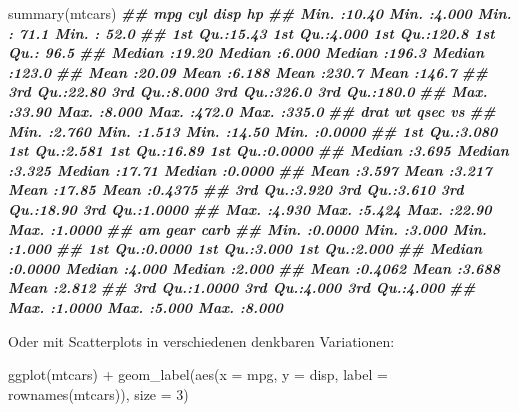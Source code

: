 \documentclass[
  ngerman,
]{article}
\newenvironment{Shaded}{\begin{snugshade}}{\end{snugshade}}
\newcommand{\AttributeTok}[1]{\textcolor[rgb]{0.77,0.63,0.00}{#1}}
\newcommand{\DecValTok}[1]{\textcolor[rgb]{0.00,0.00,0.81}{#1}}
\newcommand{\DocumentationTok}[1]{\textcolor[rgb]{0.56,0.35,0.01}{\textbf{\textit{#1}}}}
\newcommand{\FunctionTok}[1]{\textcolor[rgb]{0.00,0.00,0.00}{#1}}
\newcommand{\NormalTok}[1]{#1}
\newcommand{\SpecialCharTok}[1]{\textcolor[rgb]{0.00,0.00,0.00}{#1}}
\begin{document}
\begin{Shaded}
\begin{Highlighting}[]
\FunctionTok{summary}\NormalTok{(mtcars)}
\DocumentationTok{\#\#       mpg             cyl             disp             hp       }
\DocumentationTok{\#\#  Min.   :10.40   Min.   :4.000   Min.   : 71.1   Min.   : 52.0  }
\DocumentationTok{\#\#  1st Qu.:15.43   1st Qu.:4.000   1st Qu.:120.8   1st Qu.: 96.5  }
\DocumentationTok{\#\#  Median :19.20   Median :6.000   Median :196.3   Median :123.0  }
\DocumentationTok{\#\#  Mean   :20.09   Mean   :6.188   Mean   :230.7   Mean   :146.7  }
\DocumentationTok{\#\#  3rd Qu.:22.80   3rd Qu.:8.000   3rd Qu.:326.0   3rd Qu.:180.0  }
\DocumentationTok{\#\#  Max.   :33.90   Max.   :8.000   Max.   :472.0   Max.   :335.0  }
\DocumentationTok{\#\#       drat             wt             qsec             vs        }
\DocumentationTok{\#\#  Min.   :2.760   Min.   :1.513   Min.   :14.50   Min.   :0.0000  }
\DocumentationTok{\#\#  1st Qu.:3.080   1st Qu.:2.581   1st Qu.:16.89   1st Qu.:0.0000  }
\DocumentationTok{\#\#  Median :3.695   Median :3.325   Median :17.71   Median :0.0000  }
\DocumentationTok{\#\#  Mean   :3.597   Mean   :3.217   Mean   :17.85   Mean   :0.4375  }
\DocumentationTok{\#\#  3rd Qu.:3.920   3rd Qu.:3.610   3rd Qu.:18.90   3rd Qu.:1.0000  }
\DocumentationTok{\#\#  Max.   :4.930   Max.   :5.424   Max.   :22.90   Max.   :1.0000  }
\DocumentationTok{\#\#        am              gear            carb      }
\DocumentationTok{\#\#  Min.   :0.0000   Min.   :3.000   Min.   :1.000  }
\DocumentationTok{\#\#  1st Qu.:0.0000   1st Qu.:3.000   1st Qu.:2.000  }
\DocumentationTok{\#\#  Median :0.0000   Median :4.000   Median :2.000  }
\DocumentationTok{\#\#  Mean   :0.4062   Mean   :3.688   Mean   :2.812  }
\DocumentationTok{\#\#  3rd Qu.:1.0000   3rd Qu.:4.000   3rd Qu.:4.000  }
\DocumentationTok{\#\#  Max.   :1.0000   Max.   :5.000   Max.   :8.000}
\end{Highlighting}
\end{Shaded}

Oder mit Scatterplots in verschiedenen denkbaren Variationen:

\begin{Shaded}
\begin{Highlighting}[]
\FunctionTok{ggplot}\NormalTok{(mtcars) }\SpecialCharTok{+}
  \FunctionTok{geom\_label}\NormalTok{(}\FunctionTok{aes}\NormalTok{(}\AttributeTok{x =}\NormalTok{ mpg, }\AttributeTok{y =}\NormalTok{ disp, }\AttributeTok{label =} \FunctionTok{rownames}\NormalTok{(mtcars)), }\AttributeTok{size =} \DecValTok{3}\NormalTok{)}
\end{Highlighting}
\end{Shaded}
\end{document}
